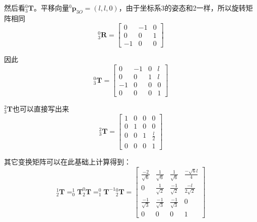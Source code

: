 \documentclass{homework}
\begin{document}
\begin{sol}
  然后看$ _3^0\mathbf{T} $。平移向量$ ^0\mathbf{p}_{3O} = (l, l, 0) $，由于坐标系3的姿态和2一样，所以旋转矩阵相同
  \[
    _3^0\mathbf{R} = 
    \begin{bmatrix}
      0 & -1 & 0 \\
      0 & 0 & 1 \\
      -1 & 0 & 0 
    \end{bmatrix}
  \]

  因此
  \[
    _3^0\mathbf{T} = 
    \begin{bmatrix}
      0 & -1 & 0 & l \\
      0 & 0 & 1 & l \\
      -1 & 0 & 0 & 0 \\
      0 & 0 & 0 & 1
    \end{bmatrix}
  \]

  $ _3^2\mathbf{T} $也可以直接写出来
  \[
    _3^2\mathbf{T} = 
    \begin{bmatrix}
      1 & 0 & 0 & 0 \\
      0 & 1 & 0 & 0 \\
      0 & 0 & 1 & \frac{l}{2} \\
      0 & 0 & 0 & 1
    \end{bmatrix}
  \]

  其它变换矩阵可以在此基础上计算得到：
  \[
    _2^1\mathbf{T} = _0^1\mathbf{T} _2^0\mathbf{T} = _1^0\mathbf{T}^{-1} {_2^0}\mathbf{T} = 
    \begin{bmatrix}
      \frac{-2}{\sqrt{6}} & \frac{1}{\sqrt{6}} & \frac{1}{\sqrt{6}} & \frac{-\sqrt{6} l}{4} \\
      0 & \frac{1}{\sqrt{2}} & \frac{-1}{\sqrt{2}} & \frac{-l}{2\sqrt{2}} \\
      \frac{-1}{\sqrt{3}} & \frac{-1}{\sqrt{3}} & \frac{-1}{\sqrt{3}} & 0 \\
      0 & 0 & 0 & 1
    \end{bmatrix}
  \]

\end{sol}

\question 
\end{document}
